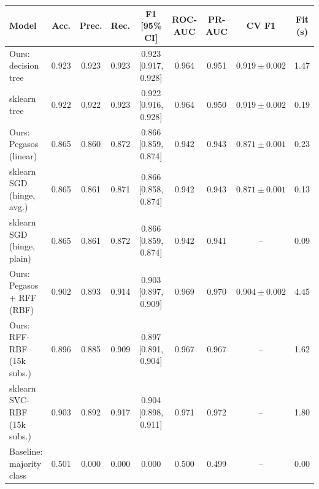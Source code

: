 \begin{tabular}{@{}lccccccc c@{}}
\toprule
Model & Acc. & Prec. & Rec. & F1 [95\% CI] & ROC-AUC & PR-AUC & CV F1 & Fit (s) \\
\midrule
Ours: decision tree & 0.923 & 0.923 & 0.923 & 0.923 [0.917, 0.928] & 0.964 & 0.951 & $0.919\pm0.002$ & 1.47 \\
sklearn tree & 0.922 & 0.922 & 0.923 & 0.922 [0.916, 0.928] & 0.964 & 0.950 & $0.919\pm0.002$ & 0.19 \\
Ours: Pegasos (linear) & 0.865 & 0.860 & 0.872 & 0.866 [0.859, 0.874] & 0.942 & 0.943 & $0.871\pm0.001$ & 0.23 \\
sklearn SGD (hinge, avg.) & 0.865 & 0.861 & 0.871 & 0.866 [0.858, 0.874] & 0.942 & 0.943 & $0.871\pm0.001$ & 0.13 \\
sklearn SGD (hinge, plain) & 0.865 & 0.861 & 0.872 & 0.866 [0.859, 0.874] & 0.942 & 0.941 & -- & 0.09 \\
Ours: Pegasos + RFF (RBF) & 0.902 & 0.893 & 0.914 & 0.903 [0.897, 0.909] & 0.969 & 0.970 & $0.904\pm0.002$ & 4.45 \\
Ours: RFF-RBF (15k subs.) & 0.896 & 0.885 & 0.909 & 0.897 [0.891, 0.904] & 0.967 & 0.967 & -- & 1.62 \\
sklearn SVC-RBF (15k subs.) & 0.903 & 0.892 & 0.917 & 0.904 [0.898, 0.911] & 0.971 & 0.972 & -- & 1.80 \\
Baseline: majority class & 0.501 & 0.000 & 0.000 & 0.000 & 0.500 & 0.499 & -- & 0.00 \\
\bottomrule
\end{tabular}

